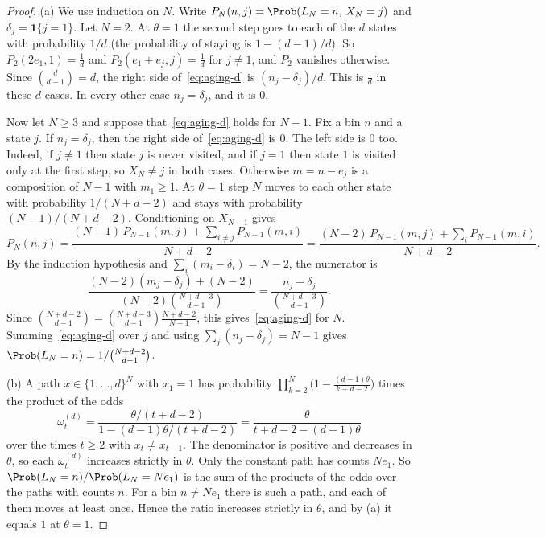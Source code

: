 \begin{proof}
(a) We use induction on $N$. Write $P_N(n,j)=\Prob(L_N=n,\,X_N=j)$ and
$\delta_j=\mathbf 1\{j=1\}$. Let $N=2$. At $\theta=1$ the second step goes to each
of the $d$ states with probability $1/d$ (the probability of staying is
$1-(d-1)/d$). So $P_2(2e_1,1)=\frac1d$ and $P_2(e_1+e_j,j)=\frac1d$ for
$j\ne1$, and $P_2$ vanishes otherwise. Since $\binom d{d-1}=d$, the right
side of~\eqref{eq:aging-d} is $(n_j-\delta_j)/d$. This is $\frac1d$ in these $d$
cases. In every other case $n_j=\delta_j$, and it is $0$.

Now let $N\ge3$ and suppose that~\eqref{eq:aging-d} holds for $N-1$. Fix a bin
$n$ and a state $j$. If $n_j=\delta_j$, then the right side of~\eqref{eq:aging-d}
is $0$. The left side is $0$ too. Indeed, if $j\ne1$ then state $j$ is never
visited, and if $j=1$ then state $1$ is visited only at the first step, so
$X_N\ne j$ in both cases. Otherwise $m=n-e_j$ is a composition of $N-1$ with
$m_1\ge1$. At $\theta=1$ step $N$ moves to each other state with probability
$1/(N+d-2)$ and stays with probability $(N-1)/(N+d-2)$. Conditioning on
$X_{N-1}$ gives
\[
 P_N(n,j)=\frac{(N-1)\,P_{N-1}(m,j)+\sum_{i\ne j}P_{N-1}(m,i)}{N+d-2}
 =\frac{(N-2)\,P_{N-1}(m,j)+\sum_{i}P_{N-1}(m,i)}{N+d-2} .
\]
By the induction hypothesis and $\sum_i(m_i-\delta_i)=N-2$, the numerator is
\[
 \frac{(N-2)(m_j-\delta_j)+(N-2)}{(N-2)\binom{N+d-3}{d-1}}
 =\frac{n_j-\delta_j}{\binom{N+d-3}{d-1}} .
\]
Since $\binom{N+d-2}{d-1}=\binom{N+d-3}{d-1}\frac{N+d-2}{N-1}$, this
gives~\eqref{eq:aging-d} for $N$. Summing~\eqref{eq:aging-d} over $j$ and
using $\sum_j(n_j-\delta_j)=N-1$ gives $\Prob(L_N=n)=1/\binom{N+d-2}{d-1}$.

(b) A path $x\in\{1,\dots,d\}^N$ with $x_1=1$ has probability
$\prod_{k=2}^N\bigl(1-\frac{(d-1)\theta}{k+d-2}\bigr)$ times the product of
the odds
\[
 \omega^{(d)}_t=\frac{\theta/(t+d-2)}{1-(d-1)\theta/(t+d-2)}
 =\frac{\theta}{t+d-2-(d-1)\theta}
\]
over the times $t\ge2$ with $x_t\ne x_{t-1}$. The denominator is positive and
decreases in $\theta$, so each $\omega^{(d)}_t$ increases strictly in
$\theta$. Only the constant path has counts $Ne_1$. So
$\Prob(L_N=n)/\Prob(L_N=Ne_1)$ is the sum of the products of the odds over
the paths with counts $n$. For a bin $n\ne Ne_1$ there is such a path, and
each of them moves at least once. Hence the ratio increases strictly in
$\theta$, and by (a) it equals $1$ at $\theta=1$.
\end{proof}


